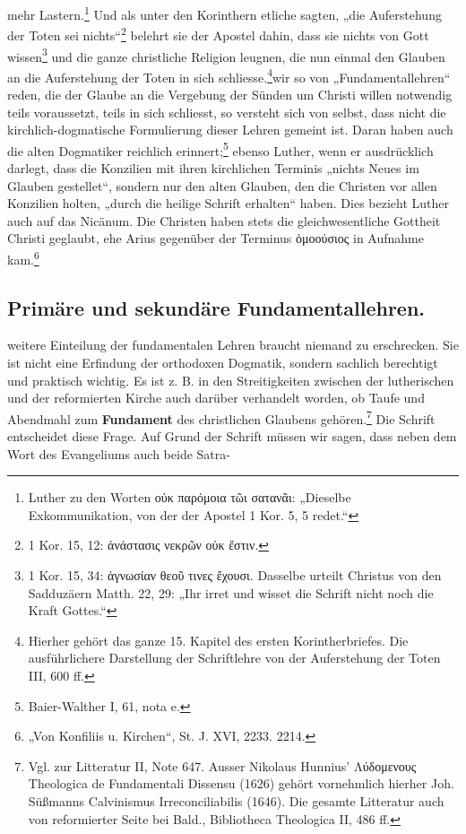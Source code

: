 mehr Lastern.\footnote{Luther zu den Worten οὐκ παρόμοια τῶι σατανᾶι: „Dieselbe Exkommunikation, von der der Apostel 1 Kor. 5, 5 redet.“} Und als unter den Korinthern etliche sagten, „die Auferstehung der Toten sei nichts“\footnote{1 Kor. 15, 12: ἀνάστασις νεκρῶν οὐκ ἔστιν.} belehrt sie der Apostel dahin, dass sie nichts von Gott wissen\footnote{1 Kor. 15, 34: ἀγνωσίαν θεοῦ τινες ἔχουσι. Dasselbe urteilt Christus von den Sadduzäern Matth. 22, 29: „Ihr irret und wisset die Schrift nicht noch die Kraft Gottes.“} und die ganze christliche Religion leugnen, die nun einmal den Glauben an die Auferstehung der Toten in sich schliesse.\footnote{Hierher gehört das ganze 15. Kapitel des ersten Korintherbriefes. Die ausführlichere Darstellung der Schriftlehre von der Auferstehung der Toten III, 600 ff.}\n\nWenn wir so von „Fundamentallehren“ reden, die der Glaube an die Vergebung der Sünden um Christi willen notwendig teils voraussetzt, teils in sich schliesst, so versteht sich von selbst, dass nicht die kirchlich-dogmatische Formulierung dieser Lehren gemeint ist. Daran haben auch die alten Dogmatiker reichlich erinnert;\footnote{Baier-Walther I, 61, nota e.} ebenso Luther, wenn er ausdrücklich darlegt, dass die Konzilien mit ihren kirchlichen Terminis „nichts Neues im Glauben gestellet“, sondern nur den alten Glauben, den die Christen vor allen Konzilien holten, „durch die heilige Schrift erhalten“ haben. Dies bezieht Luther auch auf das Nicänum. Die Christen haben stets die gleichwesentliche Gottheit Christi geglaubt, ehe Arius gegenüber der Terminus ὁμοούσιος in Aufnahme kam.\footnote{„Von Konfiliis u. Kirchen“, St. J. XVI, 2233. 2214.}\n\n\subsection*{Primäre und sekundäre Fundamentallehren.}\n\nDiese weitere Einteilung der fundamentalen Lehren braucht niemand zu erschrecken. Sie ist nicht eine Erfindung der orthodoxen Dogmatik, sondern sachlich berechtigt und praktisch wichtig. Es ist z. B. in den Streitigkeiten zwischen der lutherischen und der reformierten Kirche auch darüber verhandelt worden, ob Taufe und Abendmahl zum \textbf{Fundament} des christlichen Glaubens gehören.\footnote{Vgl. zur Litteratur II, Note 647. Ausser Nikolaus Hunnius’ Λύδομενους Theologica de Fundamentali Dissensu (1626) gehört vornehmlich hierher Joh. Süßmanns Calvinismus Irreconciliabilis (1646). Die gesamte Litteratur auch von reformierter Seite bei Bald., Bibliotheca Theologica II, 486 ff.} Die Schrift entscheidet diese Frage. Auf Grund der Schrift müssen wir sagen, dass neben dem Wort des Evangeliums auch beide Satra-